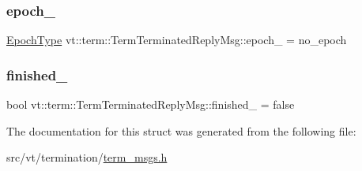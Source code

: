 \subsubsection{\texorpdfstring{epoch\+\_\+}{epoch\_}}
{\footnotesize\ttfamily \hyperlink{namespacevt_a985a5adf291c34a3ca263b3378388236}{Epoch\+Type} vt\+::term\+::\+Term\+Terminated\+Reply\+Msg\+::epoch\+\_\+ = no\+\_\+epoch\hspace{0.3cm}{\ttfamily [private]}}

\mbox{\label{structvt_1_1term_1_1_term_terminated_reply_msg_a7d5f6264f595981386a08aefee4178f1}} 
\subsubsection{\texorpdfstring{finished\+\_\+}{finished\_}}
{\footnotesize\ttfamily bool vt\+::term\+::\+Term\+Terminated\+Reply\+Msg\+::finished\+\_\+ = false\hspace{0.3cm}{\ttfamily [private]}}



The documentation for this struct was generated from the following file\+:\begin{DoxyCompactItemize}
\item 
src/vt/termination/\hyperlink{term__msgs_8h}{term\+\_\+msgs.\+h}\end{DoxyCompactItemize}
